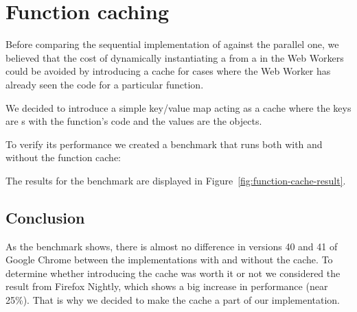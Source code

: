 \section{Function caching}\label{sec:func-caching}

Before comparing the sequential implementation of  against the parallel one, we believed that the cost of dynamically instantiating a \tfunction{} from a \tstring{} in the Web Workers could be avoided by introducing a cache for cases where the Web Worker has already seen the code for a particular function.

We decided to introduce a simple key/value map acting as a cache where the keys are \tstring{}s with the function's code and the values are the \tfunction{} objects.

To verify its performance we created a benchmark that runs both with and without the function cache:

The results for the benchmark are displayed in Figure~\ref{fig:function-cache-result}.

\subsection{Conclusion}
As the benchmark shows, there is almost no difference in versions 40 and 41 of Google Chrome between the implementations with and without the cache. To determine whether introducing the cache was worth it or not we considered the result from Firefox Nightly, which shows a big increase in performance (near 25\%). That is why we decided to make the \tfunction{} cache a part of our implementation.

\pagebreak